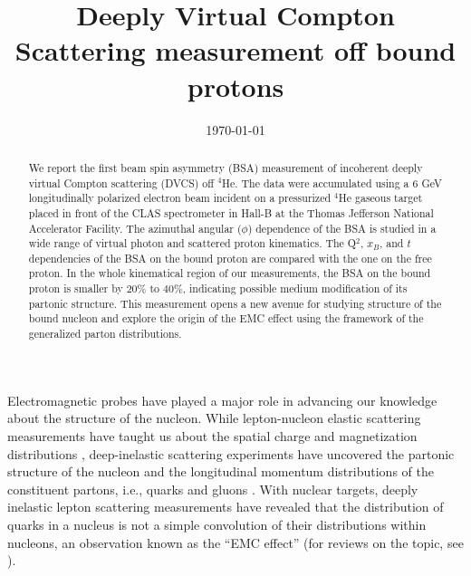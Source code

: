 \documentclass[twocolumn,nofootinbib,showpacs,prl,superscriptaddress,secnumarabic,amssymb,nobibnotes,aps,floatfix]{revtex4}
\begin{document}
\linenumbers

\title{Deeply Virtual Compton Scattering measurement off bound protons}



\date{\today}
\begin{abstract}
 We report the first beam spin asymmetry (BSA) measurement of incoherent deeply 
   virtual Compton scattering (DVCS) off $^4$He. The data were accumulated 
   using a 6 GeV longitudinally polarized electron beam incident on a 
   pressurized $^4$He gaseous target placed in front of the CLAS spectrometer 
   in Hall-B at the Thomas Jefferson National Accelerator Facility. The 
   azimuthal angular ($\phi$) dependence of the BSA is studied in a wide range 
   of virtual photon and scattered proton kinematics. The Q$^2$, $x_B$, and $t$ 
   dependencies of the BSA on the bound proton are compared with the one on the 
   free proton. In the whole kinematical region of our measurements, the BSA on 
   the bound proton is smaller by $20\%$ to $40\%$, indicating possible medium 
   modification of its partonic structure. This measurement opens a new avenue 
   for studying structure of the bound nucleon and explore the origin of the 
   EMC effect using the framework of the generalized parton distributions.

\end{abstract}

\maketitle 

Electromagnetic probes have played a major role in advancing our knowledge 
about the structure of the nucleon. While lepton-nucleon elastic scattering 
measurements have 
taught us about the spatial charge and magnetization distributions 
\cite{Hofstadter:1955ae,Perdrisat:2006hj}, deep-inelastic scattering 
experiments have uncovered the partonic structure of the nucleon and 
the longitudinal momentum distributions of the constituent partons, i.e., 
quarks and gluons \cite{pdg}.  With nuclear targets, deeply inelastic lepton 
scattering measurements have revealed that the distribution of quarks in a 
nucleus is not a simple convolution of their distributions within nucleons, an 
observation known as the ``EMC effect''\cite{EMC_first} (for reviews on the 
topic, see  \cite{Arneodo:1992wf,Geesaman:1995yd,Norton:2003cb,Hen:2016kwk}).
\end{document}
